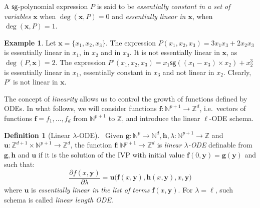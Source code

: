 \documentclass[11pt, oneside]{article}
\newcommand{\fun}[1]{\mathsf{#1}}
\newcommand{\Nat}{\mathbb{N}}
\newcommand{\tu}[1]{\mathbf{#1}}
\theoremstyle{definition}
\newtheorem{defn}{Definition}
\newtheorem{example}{Example}
\begin{document}

\noindent
A $\fun{sg}$-polynomial expression $P$ is said to be \emph{essentially constant in a set of variables $\tu x$} when $\deg(\tu x, P)=0$
and \emph{essentially linear in $\tu x$}, when $\deg(\tu x, P)=1$. 

\begin{example}
    Let $\tu x = \{x_1, x_2, x_3\}$.
    The expression $P(x_1, x_2, x_3)=3x_1x_3 + 2x_2x_3$ is essentially linear in $x_1$, in $x_2$ and in $x_3$.
    It is not essentially linear in $\tu x$, as $\deg(P, \tu x)=2$.
    The expression $P'(x_1,x_2,x_3)=x_1\fun{sg}((x_1-x_3) \times x_2) + x_2^3$ is essentially linear in $x_1$, essentially constant in $x_3$ and not linear in $x_2$.
    Clearly, $P'$ is not linear in $\tu x$.
\end{example}

\noindent
The concept of \emph{linearity} allows us to control the growth of functions defined by ODEs.
In what follows, we will consider functions $\tu f:\Nat^{p+1}\to \mathbb{Z}^d$, i.e.~vectors of functions $\tu f=f_1, \dots, f_d$ from $\Nat^{p+1}$ to $\mathbb Z$, and introduce the linear $\ell$-ODE schema.

\begin{defn}[Linear $\lambda$-ODE]~\label{def:linear length ODE}
    Given $\tu g:\Nat^p \to \Nat^d, \tu h,\lambda: \Nat^{p+1} \to \mathbb{Z}$ and $\tu u:\mathbb{Z}^{d+1}\times \Nat^{p+1} \to \mathbb{Z}^d$, the function $\tu f:\Nat^{p+1}\to \mathbb{Z}^d$ is \emph{linear $\lambda$-ODE} definable from $\tu g, \tu h$ and $\tu u$ if it is the solution of the IVP with initial value $\tu f(0, \tu y) = \tu g(\tu y)$ and such that:
    $$
        \frac{\partial f(x, \tu y)}{\partial \lambda} = \tu u\big(\tu f(x, \tu y), \tu h(x, \tu y), x, \tu y\big)
    $$
    where $\tu u$ is \emph{essentially linear in the list of terms $\tu f(x, \tu y)$}.
    For $\lambda = \ell$, such schema is called \emph{linear length ODE}.
\end{defn}
\end{document}
